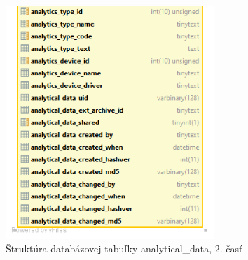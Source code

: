 \documentclass[thesis=M,slovak]{FITthesis}[2013/05/06]
\begin{document}
\begin{figure}\centering
	\includegraphics[width=0.7\textwidth]{Schema_DB_Open_Enventory/analytical_data2.png}
 	\caption[Štruktúra databázovej tabuľky analytical\_data, 2. časť]{Štruktúra databázovej tabuľky analytical\_data, 2. časť}\label{graphics:analyticalData2}
\end{figure}
\end{document}
